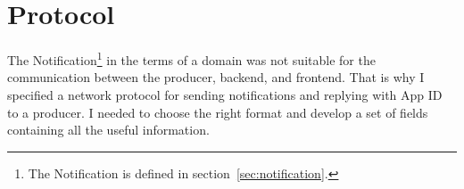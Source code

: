 \section{Protocol}\label{sec:protocol}

The Notification\footnote{
  The Notification is defined in section~\ref{sec:notification}.
} in the terms of a domain
was not suitable for the communication
between the producer, backend, and frontend.
That is why I specified a network protocol
for sending notifications
and replying with App \ac{ID} to a producer.
I needed to choose the right format
and develop a set of fields
containing all the useful information.



